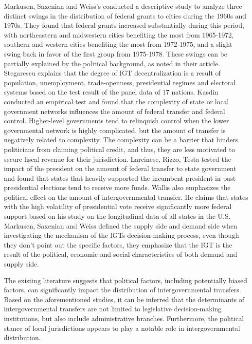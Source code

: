Markusen, Saxenian and Weiss's \cite{markusen1981benefits}conducted a descriptive study to analyze three distinct swings in the distribution of federal grants to cities during the 1960s and 1970s. They found that federal grants increased substantially during this period, with northeastern and midwestern cities benefiting the most from 1965-1972, southern and western cities benefiting the most from 1972-1975, and a slight swing back in favor of the first group from 1975-1978. These swings can be partially explained by the political background, as noted in their article. Stegarescu \cite{stegarescu2006decentralised} explains that the degree of IGT decentralization is a result of population, unemployment, trade-openness, presidential regimes and electoral systems based on the test result of the panel data of 17 nations. Kasdin \cite{kasdin2016decision} conducted an empirical test and found that the complexity of state or local government networks influences the amount of federal transfer and federal control. Higher-level governments tend to relinquish control when the lower governmental network is highly complicated, but the amount of transfer is negatively related to complexity. The complexity can be a barrier that hinders politicians from claiming political credit, and thus, they are less motivated to secure fiscal revenue for their jurisdiction. Larcinese, Rizzo, Testa \cite{larcinese2006allocating} tested the impact of the president on the amount of federal transfer to state government and found that states that heavily supported the incumbent president in past presidential elections tend to receive more funds. Wallis \cite{wallis1987employment} also emphasizes the political effect on the amount of intergovernmental transfer. He claims that states with the high volatility of presidential vote receive significantly more federal support based on his study on the longitudinal data of all states in the U.S. Markusen, Saxenian and Weiss \cite{markusen1981benefits} defined the supply side and demand side when investigating the mechanism of the IGTs decision-making process, even though they don’t point out the specific factors, they emphasize that the IGT is the result of the political, economic and social characteristics of both demand and supply side.

The existing literature suggests that political factors, including potentially biased factors, can significantly impact the distribution of intergovernmental transfers. Based on the aforementioned studies, it can be inferred that the determinants of intergovernmental transfers are not limited to legislative decision-making institutions, but also include administrative branches. Furthermore, the political stance of local jurisdictions appears to play a notable role in intergovernmental distribution.

